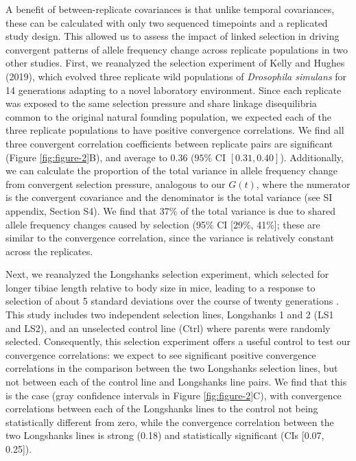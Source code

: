 \documentclass[9pt,twocolumn,twoside]{pnas-new}
\begin{document}
A benefit of between-replicate covariances is that unlike temporal covariances,
these can be calculated with only two sequenced timepoints and a replicated
study design. This allowed us to assess the impact of linked selection in
driving convergent patterns of allele frequency change across replicate
populations in two other studies. First, we reanalyzed the selection experiment
of Kelly and Hughes (2019), which evolved three replicate wild populations of
\emph{Drosophila simulans} for 14 generations adapting to a novel laboratory
environment. Since each replicate was exposed to the same selection pressure
and share linkage disequilibria common to the original natural founding
population, we expected each of the three replicate populations to have
positive convergence correlations.  We find all three convergent correlation
coefficients between replicate pairs are significant (Figure
\ref{fig:figure-2}B), and average to 0.36 ($95\%$ CI $[0.31, 0.40]$).
Additionally, we can calculate the proportion of the total variance in allele
frequency change from convergent selection pressure, analogous to our $G(t)$,
where the numerator is the convergent covariance and the denominator is the
total variance (see SI appendix, Section S4). We find that 37\% of the total
variance is due to shared allele frequency changes caused by selection (95\% CI
[29\%, 41\%]; these are similar to the convergence correlation, since the
variance is relatively constant across the replicates.


Next, we reanalyzed the Longshanks selection experiment, which selected for
longer tibiae length relative to body size in mice, leading to a response to
selection of about 5 standard deviations over the course of twenty generations
\cite{Marchini2014-de,Castro2019-uk}. This study includes two independent
selection lines, Longshanks 1 and 2 (LS1 and LS2), and an unselected control
line (Ctrl) where parents were randomly selected. Consequently, this selection
experiment offers a useful control to test our convergence correlations: we
expect to see significant positive convergence correlations in the comparison
between the two Longshanks selection lines, but not between each of the control
line and Longshanks line pairs. We find that this is the case (gray confidence
intervals in Figure \ref{fig:figure-2}C), with convergence correlations between
each of the Longshanks lines to the control not being statistically different
from zero, while the convergence correlation between the two Longshanks lines
is strong (0.18) and statistically significant (CIs [0.07, 0.25]).
\end{document}
